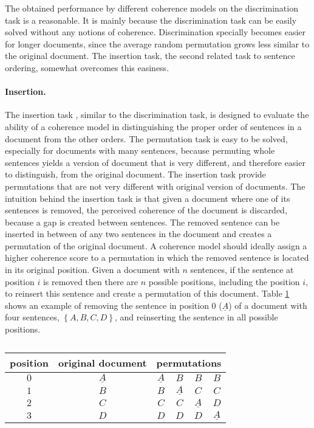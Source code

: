 The obtained performance by different coherence models \cite{} on the discrimination task is a reasonable. 
It is mainly because the discrimination task can be easily solved without any notions of coherence. 
Discrimination specially becomes easier for longer documents, since the average random permutation grows less similar to the original document. 
The insertion task, the second related task to sentence ordering, somewhat overcomes this easiness. 


\paragraph{Insertion.}
The insertion task \cite{chenerdong07}, similar to the discrimination task, is designed to evaluate the ability of a coherence model in distinguishing the proper order of sentences in a document from the other orders. 
The permutation task is easy to be solved, especially for documents with many sentences, because  permuting whole sentences yields a version of document that is very different, and therefore easier to distinguish, from the original document. 
The insertion task provide permutations that are not very different with original version of documents. 
The intuition behind the insertion task is that given a document where one of its sentences is removed, the perceived coherence of the document is discarded, because a gap is created between sentences. 
The removed sentence can be inserted in between of any two sentences in the document and creates a permutation of the original document.  
A coherence model should ideally assign a higher coherence score to a permutation in which the removed sentence is located in its original position. 
Given a document with $n$ sentences, if the sentence at position $i$ is removed then there are $n$ possible positions, including the position $i$, to reinsert this sentence and create a permutation of this document. 
Table \ref{table:insertion_task} shows an example of removing the sentence in position $0$ ($\underline{A}$) of a document with four sentences, $\left \{ A, B, C, D \right \}$, and reinserting the sentence in all possible positions. 
\begin{table}[!ht]
\centering
\begin{small}
\begin{tabular}{cc|cccc}
position & original document  & \multicolumn{4}{c}{permutations}\\
\hline
$0$ & $\underline{A}$ & $\underline{A}$ & $B$ & $B$ & $B$\\
$1$ & $B$ 			  & $B$  & $\underline{A}$ & $C$ & $C$\\
$2$ & $C$			  & $C$ & $C$ & $\underline{A}$ & $D$\\
$3$ & $D$			  & $D$ & $D$ & $D$ & $\underline{A}$\\
\end{tabular}
\end{small}
\caption{}
\label{table:insertion_task}  
\end{table}

